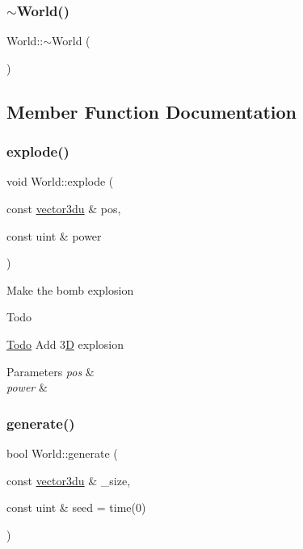 \subsubsection{\texorpdfstring{$\sim$World()}{~World()}}
{\footnotesize\ttfamily World\+::$\sim$\+World (\begin{DoxyParamCaption}{ }\end{DoxyParamCaption})}



\subsection{Member Function Documentation}
\mbox{\label{class_world_affc0ca196e8806697260336c57f53d6e}} 
\subsubsection{\texorpdfstring{explode()}{explode()}}
{\footnotesize\ttfamily void World\+::explode (\begin{DoxyParamCaption}\item[{const \mbox{\hyperlink{_utility_8hpp_ac675fa2b6c79d0be47ae76e5d0ce38a8}{vector3du}} \&}]{pos,  }\item[{const uint \&}]{power }\end{DoxyParamCaption})}

Make the bomb explosion \begin{DoxyRefDesc}{Todo}
\item[\mbox{\hyperlink{todo__todo000004}{Todo}}]Add 3\mbox{\hyperlink{namespace_d}{D}} explosion \end{DoxyRefDesc}

\begin{DoxyParams}{Parameters}
{\em pos} & \\
\hline
{\em power} & \\
\hline
\end{DoxyParams}
\mbox{\label{class_world_a9f9fb4301a1f96649db884f6ce7f3e25}} 
\subsubsection{\texorpdfstring{generate()}{generate()}}
{\footnotesize\ttfamily bool World\+::generate (\begin{DoxyParamCaption}\item[{const \mbox{\hyperlink{_utility_8hpp_ac675fa2b6c79d0be47ae76e5d0ce38a8}{vector3du}} \&}]{\+\_\+size,  }\item[{const uint \&}]{seed = {\ttfamily time(0)} }\end{DoxyParamCaption})}

